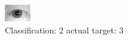 \begin{figure}[h!]
\begin{center}
\includegraphics[width=0.60\columnwidth]{figures/ID1139_class_2_target_3.png}
\end{center}
\caption{ Classification: 2 actual target: 3}
\label{fig:ID1139_class_2_target_3}
\end{figure}
